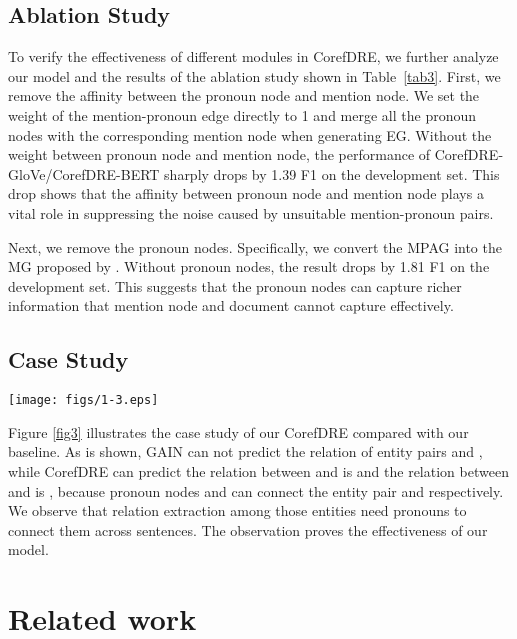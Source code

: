 \documentclass{article}
\begin{document}
\subsection{Ablation Study}

To verify the effectiveness of different modules in CorefDRE, we further analyze our model and the results of the ablation study shown in Table~\ref{tab3}.
First, we remove the affinity between the pronoun node and mention node. We set the weight of the mention-pronoun edge directly to 1 and merge all the pronoun nodes with the corresponding mention node when generating EG. Without the weight between pronoun node and mention node, the performance of CorefDRE-GloVe/CorefDRE-BERT sharply drops by 1.39 F1 on the development set. This drop shows that the affinity between pronoun node and mention node plays a vital role in suppressing the noise caused by unsuitable mention-pronoun pairs.

Next, we remove the pronoun nodes. Specifically, we convert the MPAG into the MG proposed by \cite{zeng2020double}. Without pronoun nodes, the result drops by 1.81 F1 on the development set. This suggests that the pronoun nodes can capture richer information that mention node and document cannot capture effectively. 

\subsection{Case Study}
\begin{figure*}[ht]
    \centering
    \setlength{\abovecaptionskip}{0.4cm}
    \setlength{\belowcaptionskip}{-0.4cm}
    \vspace{-0.8cm}
    \texttt{[image: figs/1-3.eps]}
    \caption{Case Study on our CorefDRE model and baseline model. The graph indicates our model based on MPAG can extract the relations while other models, GAIN, have not the inference.}
    \label{fig3}
\end{figure*}
Figure \ref{fig3} illustrates the case study of our CorefDRE compared with our baseline. As is shown, GAIN can not predict the relation of entity pairs  and , while CorefDRE can predict the relation between   and   is   and the relation between   and    is , because pronoun nodes  and  can connect the entity pair  and  respectively. We observe that relation extraction among those entities need pronouns to connect them across sentences. The observation proves the effectiveness of our model.

\section{Related work}
\end{document}
